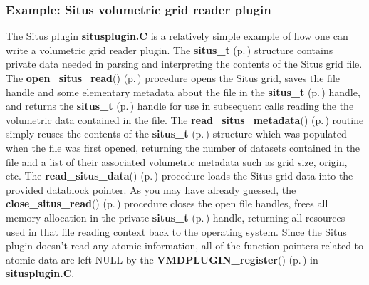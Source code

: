  \subsubsection*{Example: Situs volumetric grid reader plugin}
 The Situs plugin {\bf situsplugin.C} is a relatively  simple example of how one can write a volumetric grid reader plugin. The {\bf situs\_\-t} {\rm (p.\,\pageref{structsitus__t})} structure contains private data needed in parsing and interpreting the contents of the Situs grid file. The {\bf open\_\-situs\_\-read}() {\rm (p.\,\pageref{situsplugin_8C_a1})} procedure opens the Situs grid, saves the file handle and some elementary metadata about the file in the {\bf situs\_\-t} {\rm (p.\,\pageref{structsitus__t})} handle, and returns the {\bf situs\_\-t} {\rm (p.\,\pageref{structsitus__t})} handle for use in subsequent calls reading the the volumetric data contained in the file. The {\bf read\_\-situs\_\-metadata}() {\rm (p.\,\pageref{situsplugin_8C_a2})} routine simply reuses the contents of the {\bf situs\_\-t} {\rm (p.\,\pageref{structsitus__t})} structure which was populated when the file was first opened, returning the number of datasets contained in the file and a list of their associated volumetric metadata such as grid size, origin, etc. The {\bf read\_\-situs\_\-data}() {\rm (p.\,\pageref{situsplugin_8C_a3})} procedure loads the Situs grid data into the provided datablock pointer. As you may have already guessed, the {\bf close\_\-situs\_\-read}() {\rm (p.\,\pageref{situsplugin_8C_a4})} procedure closes the open file handles, frees all memory allocation in the private {\bf situs\_\-t} {\rm (p.\,\pageref{structsitus__t})} handle, returning all resources used in that file reading context back to  the operating system. Since the Situs plugin doesn't read any atomic information, all of the function pointers related to atomic data are left NULL by the {\bf VMDPLUGIN\_\-register}() {\rm (p.\,\pageref{vmdplugin_8h_a3})} in {\bf situsplugin.C}.

